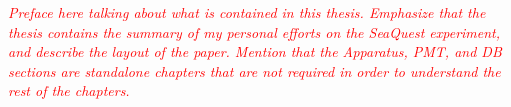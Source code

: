 \documentclass[edeposit,fullpage]{uiucthesis2009}
\newcommand{\red}[1]{\emph{\textcolor{red}{#1}}}
\begin{document}
\red{Preface here talking about what is contained in this thesis. Emphasize that the thesis contains the summary of my personal efforts on the SeaQuest experiment, and describe the layout of the paper. Mention that the Apparatus, PMT, and DB sections are standalone chapters that are not required in order to understand the rest of the chapters.}










\appendix



\backmatter



\end{document}
